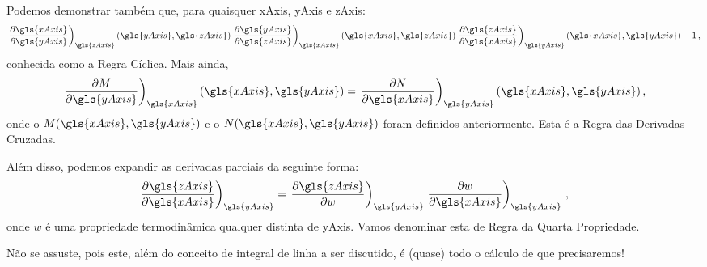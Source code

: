     Podemos demonstrar também que, para quaisquer \gls{xAxis}, \gls{yAxis} e
    \gls{zAxis}:
    \begin{equation} \label{eq:5.3}
        \ddxconsty{
            \gls{xAxis}
        }{
            \gls{yAxis}
        }{
            \gls{zAxis}
        }
        \functionOf{
            \gls{yAxis},
            \gls{zAxis}
        }
        \ddxconsty{
            \gls{yAxis}
        }{
            \gls{zAxis}
        }{
            \gls{xAxis}
        }
        \functionOf{
            \gls{xAxis},
            \gls{zAxis}
        }
        \ddxconsty{
            \gls{zAxis}
        }{
            \gls{xAxis}
        }{
            \gls{yAxis}
        }
        \functionOf{
            \gls{xAxis},
            \gls{yAxis}
        }
        -1\,,
    \end{equation}
    conhecida como a Regra Cíclica. Mais ainda,
    \begin{equation} \label{eq:5.4}
        \ddxconsty{
            M
        }{
            \gls{yAxis}
        }{
            \gls{xAxis}
        }
        \functionOf{
            \gls{xAxis},
            \gls{yAxis}
        }
        =
        \ddxconsty{
            N
        }{
            \gls{xAxis}
        }{
            \gls{yAxis}
        }
        \functionOf{
            \gls{xAxis},
            \gls{yAxis}
        }\,,
    \end{equation}
    onde o $M\functionOf{\gls{xAxis},\gls{yAxis}}$ e o
    $N\functionOf{\gls{xAxis},\gls{yAxis}}$ foram definidos anteriormente. Esta
    é a Regra das Derivadas Cruzadas.

    Além disso, podemos expandir as derivadas parciais da seguinte forma:
    \begin{equation}
        \ddxconsty{
            \gls{zAxis}
        }{
            \gls{xAxis}
        }{
            \gls{yAxis}
        }
        =
        \ddxconsty{
            \gls{zAxis}
        }{
            w
        }{
            \gls{yAxis}
        }
        \ddxconsty{
            w
        }{
            \gls{xAxis}
        }{
            \gls{yAxis}
        }\,,
    \end{equation}
    onde $w$ é uma propriedade termodinâmica qualquer distinta de \gls{yAxis}.
    Vamos denominar esta de Regra da Quarta Propriedade.

    Não se assuste, pois este, além do conceito de integral de linha a ser
    discutido, é (quase) todo o cálculo de que precisaremos!


